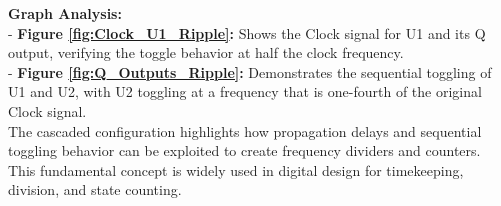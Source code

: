 \documentclass{article}
\begin{document}
    \textbf{Graph Analysis:} \\
    - \textbf{Figure \ref{fig:Clock_U1_Ripple}:} Shows the Clock signal for U1 and its Q output, verifying the toggle behavior at half the clock frequency. \\
    - \textbf{Figure \ref{fig:Q_Outputs_Ripple}:} Demonstrates the sequential toggling of U1 and U2, with U2 toggling at a frequency that is one-fourth of the original Clock signal. \\

    The cascaded configuration highlights how propagation delays and sequential toggling behavior can be exploited to create frequency dividers and counters. This fundamental concept is widely used in digital design for timekeeping, division, and state counting.


    


  
\end{document}
